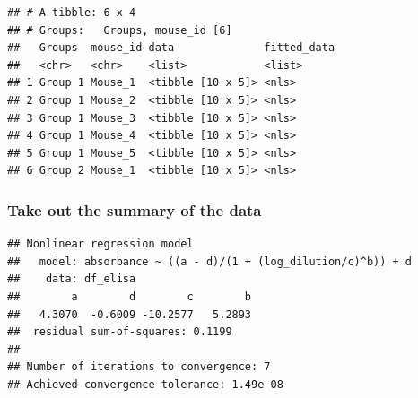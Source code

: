\documentclass[
]{book}
\newenvironment{Shaded}{\begin{snugshade}}{\end{snugshade}}
\newcommand{\AttributeTok}[1]{\textcolor[rgb]{0.77,0.63,0.00}{#1}}
\newcommand{\DecValTok}[1]{\textcolor[rgb]{0.00,0.00,0.81}{#1}}
\newcommand{\FunctionTok}[1]{\textcolor[rgb]{0.00,0.00,0.00}{#1}}
\newcommand{\NormalTok}[1]{#1}
\newcommand{\OtherTok}[1]{\textcolor[rgb]{0.56,0.35,0.01}{#1}}
\newcommand{\SpecialCharTok}[1]{\textcolor[rgb]{0.00,0.00,0.00}{#1}}
\begin{document}
\begin{verbatim}
## # A tibble: 6 x 4
## # Groups:   Groups, mouse_id [6]
##   Groups  mouse_id data              fitted_data
##   <chr>   <chr>    <list>            <list>     
## 1 Group 1 Mouse_1  <tibble [10 x 5]> <nls>      
## 2 Group 1 Mouse_2  <tibble [10 x 5]> <nls>      
## 3 Group 1 Mouse_3  <tibble [10 x 5]> <nls>      
## 4 Group 1 Mouse_4  <tibble [10 x 5]> <nls>      
## 5 Group 1 Mouse_5  <tibble [10 x 5]> <nls>      
## 6 Group 2 Mouse_1  <tibble [10 x 5]> <nls>
\end{verbatim}

\hypertarget{take-out-the-summary-of-the-data}{%
\subsubsection{Take out the summary of the data}\label{take-out-the-summary-of-the-data}}

\begin{Shaded}
\end{Shaded}

\begin{verbatim}
## Nonlinear regression model
##   model: absorbance ~ ((a - d)/(1 + (log_dilution/c)^b)) + d
##    data: df_elisa
##        a        d        c        b 
##   4.3070  -0.6009 -10.2577   5.2893 
##  residual sum-of-squares: 0.1199
## 
## Number of iterations to convergence: 7 
## Achieved convergence tolerance: 1.49e-08
\end{verbatim}
\end{document}
